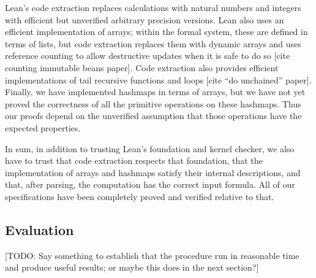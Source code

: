 Lean's code extraction replaces calculations with natural numbers and integers with
efficient but unverified arbitrary precision versions.
Lean also uses an efficient implementation of arrays; within the
formal system, these are defined in terms of lists, but code extraction replaces them
with dynamic arrays and uses reference counting to allow destructive updates when it is safe
to do so [cite counting immutable beans paper].
Code extraction also provides efficient implementations of tail recursive functions and loops
[cite ``do unchained'' paper].
Finally, we have implemented hashmaps in terms of arrays, but we have not yet proved
the correctness of all the primitive operations on these hashmaps.
Thus our proofs depend on the unverified assumption that those operations have the
expected properties.

In sum, in addition to trusting Lean's foundation and kernel checker,
we also have to trust that code extraction respects that foundation,
that the implementation of arrays and hashmaps satisfy their internal descriptions,
and that, after parsing, the computation has the correct input formula.
All of our specifications have been completely proved and verified relative to that.

\subsection{Evaluation}

[TODO: Say something to establish that the procedure run in reasonable time and produce useful results; or maybe this does in the next section?]